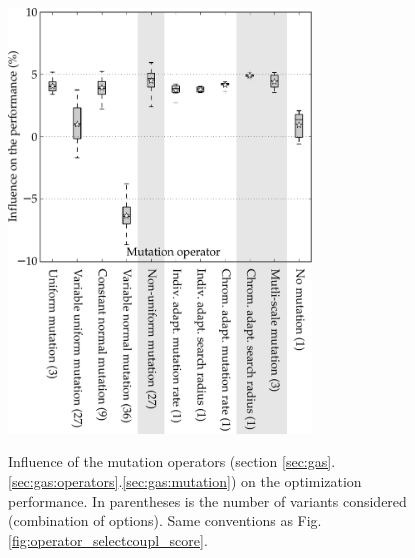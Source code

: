 \documentclass{ametsoc}
\begin{document}
\begin{figure}[t]
	\begin{center}
		\noindent\includegraphics[width=19pc,angle=0]{fig07.pdf}\\
	\end{center}
	\caption{Influence of the mutation operators (section \ref{sec:gas}.\ref{sec:gas:operators}.\ref{sec:gas:mutation}) on the optimization performance. In parentheses is the number of variants considered (combination of options). Same conventions as Fig. \ref{fig:operator_selectcoupl_score}.}
	\label{fig:operator_mutation_score}
\end{figure}
\end{document}
